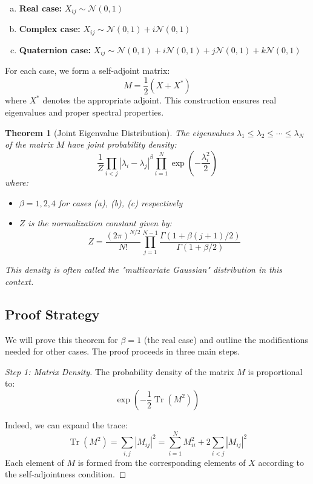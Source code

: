 \documentclass[letterpaper,11pt,oneside,reqno]{article}
\numberwithin{equation}{section}
\newtheorem{theorem}[proposition]{Theorem}
\theoremstyle{definition}
\begin{document}
\begin{enumerate}[a)]
\item \textbf{Real case:} $X_{ij} \sim \mathcal{N}(0,1)$
\item \textbf{Complex case:} $X_{ij} \sim \mathcal{N}(0,1) + i\mathcal{N}(0,1)$
\item \textbf{Quaternion case:} $X_{ij} \sim \mathcal{N}(0,1) + i\mathcal{N}(0,1) + j\mathcal{N}(0,1) + k\mathcal{N}(0,1)$
\end{enumerate}

For each case, we form a self-adjoint matrix:
\[ M = \frac{1}{2}(X + X^*) \]
where $X^*$ denotes the appropriate adjoint. This construction ensures real eigenvalues and proper spectral properties.

\begin{theorem}[Joint Eigenvalue Distribution]
\label{thm:joint_density}
The eigenvalues $\lambda_1 \leq \lambda_2 \leq \cdots \leq \lambda_N$ of the matrix $M$ have joint probability density:
\[ \frac{1}{Z} \prod_{i<j} |\lambda_i-\lambda_j|^\beta \prod_{i=1}^N \exp\left(-\frac{\lambda_i^2}{2}\right) \]
where:
\begin{itemize}
\item $\beta = 1,2,4$ for cases (a), (b), (c) respectively
\item $Z$ is the normalization constant given by:
\[ Z = \frac{(2\pi)^{N/2}}{N!} \prod_{j=1}^{N-1} \frac{\Gamma(1+\beta(j+1)/2)}{\Gamma(1+\beta/2)} \]
\end{itemize}
This density is often called the "multivariate Gaussian" distribution in this context.
\end{theorem}

\subsection{Proof Strategy}

We will prove this theorem for $\beta=1$ (the real case) and outline the modifications needed for other cases. The proof proceeds in three main steps.

\begin{proof}[Step 1: Matrix Density]
The probability density of the matrix $M$ is proportional to:
\[ \exp\left(-\frac{1}{2}\operatorname{Tr}(M^2)\right) \]

Indeed, we can expand the trace:
\[ \operatorname{Tr}(M^2) = \sum_{i,j} |M_{ij}|^2 = \sum_{i=1}^N M_{ii}^2 + 2\sum_{i<j} |M_{ij}|^2 \]
Each element of $M$ is formed from the corresponding elements of $X$ according to the self-adjointness condition.
\end{proof}
\end{document}
